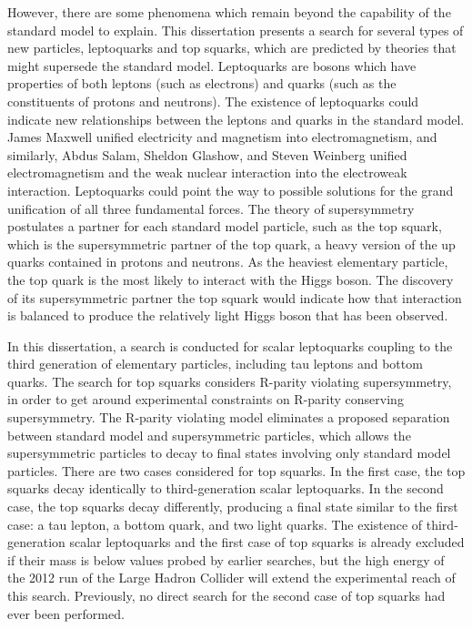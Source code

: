 \documentclass[12pt]{thesis}  %
\begin{document}
However, there are some phenomena which remain beyond the capability of the standard model to explain. This dissertation presents a search for several types of new particles, leptoquarks and top squarks, which are predicted by theories that might supersede the standard model. Leptoquarks are bosons which have properties of both leptons (such as electrons) and quarks (such as the constituents of protons and neutrons). The existence of leptoquarks could indicate new relationships between the leptons and quarks in the standard model. James Maxwell unified electricity and magnetism into electromagnetism, and similarly, Abdus Salam, Sheldon Glashow, and Steven Weinberg unified electromagnetism and the weak nuclear interaction into the electroweak interaction. Leptoquarks could point the way to possible solutions for the grand unification of all three fundamental forces. The theory of supersymmetry postulates a partner for each standard model particle, such as the top squark, which is the supersymmetric partner of the top quark, a heavy version of the up quarks contained in protons and neutrons. As the heaviest elementary particle, the top quark is the most likely to interact with the Higgs boson. The discovery of its supersymmetric partner the top squark would indicate how that interaction is balanced to produce the relatively light Higgs boson that has been observed.

In this dissertation, a search is conducted for scalar leptoquarks coupling to the third generation of elementary particles, including tau leptons and bottom quarks. The search for top squarks considers R-parity violating supersymmetry, in order to get around experimental constraints on R-parity conserving supersymmetry. The R-parity violating model eliminates a proposed separation between standard model and supersymmetric particles, which allows the supersymmetric particles to decay to final states involving only standard model particles. There are two cases considered for top squarks. In the first case, the top squarks decay identically to third-generation scalar leptoquarks. In the second case, the top squarks decay differently, producing a final state similar to the first case: a tau lepton, a bottom quark, and two light quarks. The existence of third-generation scalar leptoquarks and the first case of top squarks is already excluded if their mass is below values probed by earlier searches, but the high energy of the 2012 run of the Large Hadron Collider will extend the experimental reach of this search. Previously, no direct search for the second case of top squarks had ever been performed.
\end{document}
